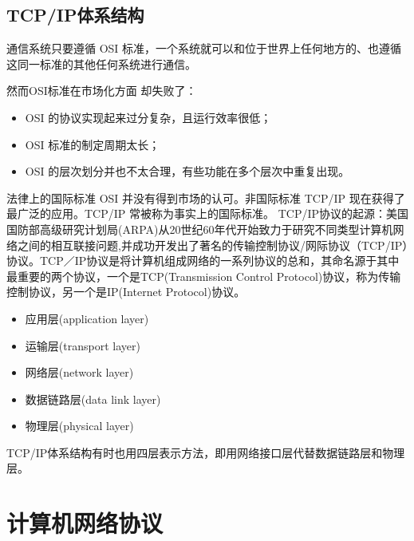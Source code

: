 \subsection{TCP/IP体系结构}

通信系统只要遵循 OSI 标准，一个系统就可以和位于世界上任何地方的、也遵循这同一标准的其他任何系统进行通信。

然而OSI标准在市场化方面 却失败了：

\begin{itemize}
  \item OSI 的协议实现起来过分复杂，且运行效率很低；

  \item OSI 标准的制定周期太长；

  \item OSI 的层次划分并也不太合理，有些功能在多个层次中重复出现。

\end{itemize}

法律上的国际标准 OSI 并没有得到市场的认可。非国际标准 TCP/IP 现在获得了最广泛的应用。TCP/IP 常被称为事实上的国际标准。
TCP/IP协议的起源：美国国防部高级研究计划局(ARPA)从20世纪60年代开始致力于研究不同类型计算机网络之间的相互联接问题,并成功开发出了著名的传输控制协议/网际协议（TCP/IP）协议。TCP／IP协议是将计算机组成网络的一系列协议的总和，其命名源于其中最重要的两个协议，一个是TCP(Transmission Control Protocol)协议，称为传输控制协议，另一个是IP(Internet Protocol)协议。

\begin{itemize}
  \item 应用层(application layer)

  \item 运输层(transport layer)

  \item 网络层(network layer)

  \item 数据链路层(data link layer)

  \item 物理层(physical layer)

\end{itemize}

\begin{remark}
  TCP/IP体系结构有时也用四层表示方法，即用网络接口层代替数据链路层和物理层。

\end{remark}

\section{计算机网络协议}


